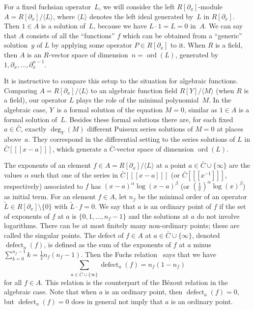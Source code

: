 \documentclass[final,1p,times,authoryear]{elsarticle}
\def\ord{\operatorname{ord}}
\def\<#1>{\langle#1\rangle}
\def\defect{\operatorname{defect}}
\begin{document}
For a fixed fuchsian operator~$L$, we will consider the left $R[\partial_x]$-module
$A=R[\partial_x]/\<L>$, where $\<L>$ denotes the left ideal generated by~$L$ in
$R[\partial_x]$.  Then $1\in A$ is a solution of~$L$, because we have $L\cdot 1=L=0$
in~$A$. We can say that $A$ consists of all the ``functions'' $f$ which can be
obtained from a ``generic'' solution~$y$ of $L$ by applying some operator $P\in
R[\partial_x]$ to it. When $R$ is a field, then $A$ is an $R$-vector space of
dimension~$n=\ord(L)$, generated by $1,\partial_x,\dots,\partial_x^{n-1}$.

It is instructive to compare this setup to the situation for algebraic
functions. Comparing $A=R[\partial_x]/\<L>$ to an algebraic function field $R[Y]/\<M>$
(when $R$ is a field), our operator $L$ plays the role of the minimal
polynomial~$M$. In the algebraic case, $Y$~is a formal solution of the equation
$M=0$, similar as $1\in A$ is a formal solution of~$L$. Besides these formal
solutions there are, for each fixed $a\in\bar C$, exactly $\deg_Y(M)$ different
Puiseux series solutions of $M=0$ at places above~$a$. They correspond in the
differential setting to the series solutions of $L$ in $\bar C[[[x-a]]]$, which
generate a $\bar C$-vector space of dimension $\ord(L)$.

The exponents of an element $f\in A=R[\partial_x]/\<L>$ at a point $a\in\bar C\cup\{\infty\}$
are the values $\alpha$ such that one of the series in $\bar C[[[x-a]]]$ (or $\bar C[[[x^{-1}]]]$, respectively)
associated to $f$ has $(x-a)^\alpha\log(x-a)^\beta$ (or $(\frac1x)^\alpha\log(x)^\beta$) as initial term.
For an element $f\in A$, let $n_f$ be the minimal order of an operator
$\tilde{L}\in R[\partial_x]\setminus\{0\}$ with $\tilde{L}\cdot f=0$.
We say that $a$ is an ordinary point of $f$ if the set of exponents of $f$ at $a$
is $\{0,1,\dots,n_f-1\}$ and the solutions at $a$ do not involve logarithms.
There can be at most finitely many non-ordinary points; these are called the singular points.
The defect of $f\in A$ at $a\in\bar C\cup\{\infty\}$, denoted $\defect_a(f)$, is defined
as the sum of the exponents of $f$ at $a$ minus $\sum_{k=0}^{n_f-1}k=\frac12n_f(n_f-1)$.
Then the Fuchs relation~\citep{schlesinger95,ince26} says that we have
\[
 \sum_{a\in\bar C\cup\{\infty\}} \defect_a(f) = n_f(1-n_f)
\]
for all $f\in A$. This relation is the counterpart of the B\'{e}zout relation in the algebraic case.
Note that when $a$ is an ordinary point, then $\defect_a(f)=0$, but $\defect_a(f)=0$ does in
general not imply that $a$ is an ordinary point.
\end{document}
